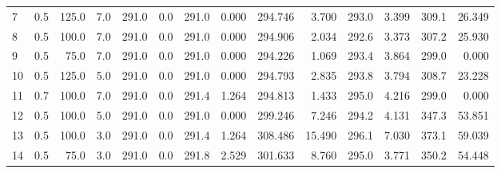 \begin{tabular}{lrrrrrrrrrrrrr}
7  & 0.5    & 125.0 & 7.0     & 291.0                                            & 0.0                                & 291.0                             & 0.000                               & 294.746 & 3.700    & 293.0 & 3.399    & 309.1 & 26.349   \\
8  & 0.5    & 100.0 & 7.0     & 291.0                                            & 0.0                                & 291.0                             & 0.000                               & 294.906 & 2.034    & 292.6 & 3.373    & 307.2 & 25.930   \\
9  & 0.5    & 75.0  & 7.0     & 291.0                                            & 0.0                                & 291.0                             & 0.000                               & 294.226 & 1.069    & 293.4 & 3.864    & 299.0 & 0.000    \\
10 & 0.5    & 125.0 & 5.0     & 291.0                                            & 0.0                                & 291.0                             & 0.000                               & 294.793 & 2.835    & 293.8 & 3.794    & 308.7 & 23.228   \\
11 & 0.7    & 100.0 & 7.0     & 291.0                                            & 0.0                                & 291.4                             & 1.264                               & 294.813 & 1.433    & 295.0 & 4.216    & 299.0 & 0.000    \\
12 & 0.5    & 100.0 & 5.0     & 291.0                                            & 0.0                                & 291.0                             & 0.000                               & 299.246 & 7.246    & 294.2 & 4.131    & 347.3 & 53.851   \\
13 & 0.5    & 100.0 & 3.0     & 291.0                                            & 0.0                                & 291.4                             & 1.264                               & 308.486 & 15.490   & 296.1 & 7.030    & 373.1 & 59.039   \\
14 & 0.5    & 75.0  & 3.0     & 291.0                                            & 0.0                                & 291.8                             & 2.529                               & 301.633 & 8.760    & 295.0 & 3.771    & 350.2 & 54.448   \\
\bottomrule
\end{tabular}
